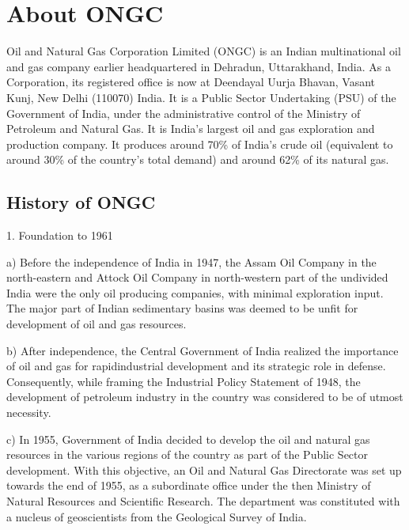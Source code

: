 \documentclass[11pt,a4paper]{article}
\makeatletter
\newcommand\mainmatter{%
    \cleardoublepage
  \pagenumbering{arabic}}
\makeatother
\begin{document}
\newpage


\listoftables


\newpage


\listoffigures


\newpage

\mainmatter

\newpage
  

\section{\textbf{About ONGC}}

Oil and Natural Gas Corporation Limited (ONGC) is an Indian multinational oil and gas company earlier headquartered in Dehradun, Uttarakhand, India. As a Corporation, its registered office is now at Deendayal Uurja Bhavan, Vasant Kunj, New Delhi (110070) India. It is a Public Sector Undertaking (PSU) of the
Government of India, under the administrative control of the Ministry of Petroleum and Natural Gas. It is India's largest oil and gas exploration and production company. It produces around 70\% of India's crude oil (equivalent to around 30\% of the country's total demand) and around 62\% of its natural gas.

\subsection{\textbf{History of ONGC}}

1. Foundation to 1961

a) Before the independence of India in 1947, the Assam Oil Company in the north-eastern and Attock Oil Company in north-western part of the undivided India
were the only oil producing companies, with minimal exploration input. The major part of Indian sedimentary basins was deemed to be unfit for development of oil
and gas resources.

b) After independence, the Central Government of India realized the importance of oil and gas for rapidindustrial development and its strategic role in defense.
Consequently, while framing the Industrial Policy Statement of 1948, the development of petroleum industry in the country was considered to be of utmost
necessity.

c) In 1955, Government of India decided to develop the oil and natural gas resources in the various regions of the country as part of the Public Sector development. With this objective, an Oil and Natural Gas Directorate was set up towards the end of 1955, as a subordinate office under the then Ministry of Natural Resources and
Scientific Research. The department was constituted with a nucleus of geoscientists from the Geological Survey of India.
\end{document}
